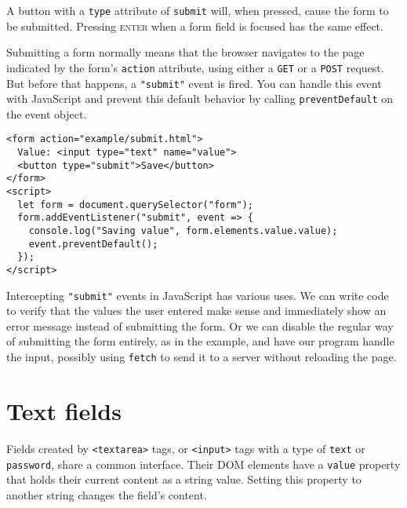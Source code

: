 A button with a \lstinline`type` attribute of \lstinline`submit` will, when pressed, cause the form to be submitted. Pressing \textsc{enter} when a form field is focused has the same effect.

Submitting a form normally means that the browser navigates to the page indicated by the form's \lstinline`action` attribute, using either a \lstinline`GET` or a \lstinline`POST` request. But before that happens, a \lstinline`"submit"` event is fired. You can handle this event with JavaScript and prevent this default behavior by calling \lstinline`preventDefault` on the event object.

\begin{lstlisting}
<form action="example/submit.html">
  Value: <input type="text" name="value">
  <button type="submit">Save</button>
</form>
<script>
  let form = document.querySelector("form");
  form.addEventListener("submit", event => {
    console.log("Saving value", form.elements.value.value);
    event.preventDefault();
  });
</script>
\end{lstlisting}
\noindent{}

Intercepting \lstinline`"submit"` events in JavaScript has various uses. We can write code to verify that the values the user entered make sense and immediately show an error message instead of submitting the form. Or we can disable the regular way of submitting the form entirely, as in the example, and have our program handle the input, possibly using \lstinline`fetch` to send it to a server without reloading the page.

\section{Text fields}

Fields created by \lstinline`<textarea>` tags, or \lstinline`<input>` tags with a type of \lstinline`text` or \lstinline`password`, share a common interface. Their DOM elements have a \lstinline`value` property that holds their current content as a string value. Setting this property to another string changes the field's content.

